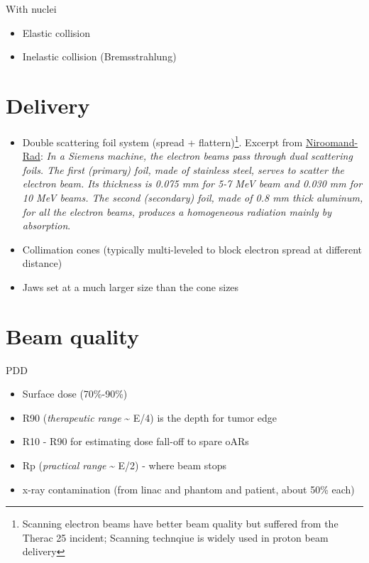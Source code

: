 \documentclass[]{book}
\providecommand{\tightlist}{%
  \setlength{\itemsep}{0pt}\setlength{\parskip}{0pt}}
\let\rmarkdownfootnote\footnote%
\def\footnote{\protect\rmarkdownfootnote}
\theoremstyle{definition}
\theoremstyle{definition}
\theoremstyle{definition}
\theoremstyle{remark}
\begin{document}
With nuclei

\begin{itemize}
\tightlist
\item
  Elastic collision
\item
  Inelastic collision (Bremsstrahlung)
\end{itemize}

\section{Delivery}\label{e-delivery}

\begin{itemize}
\item
  Double scattering foil system (spread + flattern)\footnote{Scanning
    electron beams have better beam quality but suffered from the Therac
    25 incident; Scanning technqiue is widely used in proton beam
    delivery}. Excerpt from
  \href{http://www.sciencedirect.com/science/article/pii/0360301686903615}{Niroomand-Rad}:
  \emph{In a Siemens machine, the electron beams pass through dual
  scattering foils. The first (primary) foil, made of stainless steel,
  serves to scatter the electron beam. Its thickness is 0.075 mm for 5-7
  MeV beam and 0.030 mm for 10 MeV beams. The second (secondary) foil,
  made of 0.8 mm thick aluminum, for all the electron beams, produces a
  homogeneous radiation mainly by absorption}.
\item
  Collimation cones (typically multi-leveled to block electron spread at
  different distance)
\item
  Jaws set at a much larger size than the cone sizes
\end{itemize}

\section{Beam quality}\label{beam-quality}

PDD

\begin{itemize}
\tightlist
\item
  Surface dose (70\%-90\%)
\item
  R90 (\emph{therapeutic range} \textasciitilde{} E/4) is the depth for
  tumor edge
\item
  R10 - R90 for estimating dose fall-off to spare oARs
\item
  Rp (\emph{practical range} \textasciitilde{} E/2) - where beam stops
\item
  x-ray contamination (from linac and phantom and patient, about 50\%
  each)
\end{itemize}
\end{document}
